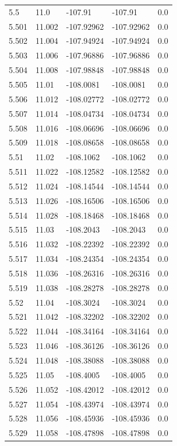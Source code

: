 \begin{tabular}{lllll}
5.5 & 11.0 & -107.91 & -107.91 & 0.0 \\
5.501 & 11.002 & -107.92962 & -107.92962 & 0.0 \\
5.502 & 11.004 & -107.94924 & -107.94924 & 0.0 \\
5.503 & 11.006 & -107.96886 & -107.96886 & 0.0 \\
5.504 & 11.008 & -107.98848 & -107.98848 & 0.0 \\
5.505 & 11.01 & -108.0081 & -108.0081 & 0.0 \\
5.506 & 11.012 & -108.02772 & -108.02772 & 0.0 \\
5.507 & 11.014 & -108.04734 & -108.04734 & 0.0 \\
5.508 & 11.016 & -108.06696 & -108.06696 & 0.0 \\
5.509 & 11.018 & -108.08658 & -108.08658 & 0.0 \\
5.51 & 11.02 & -108.1062 & -108.1062 & 0.0 \\
5.511 & 11.022 & -108.12582 & -108.12582 & 0.0 \\
5.512 & 11.024 & -108.14544 & -108.14544 & 0.0 \\
5.513 & 11.026 & -108.16506 & -108.16506 & 0.0 \\
5.514 & 11.028 & -108.18468 & -108.18468 & 0.0 \\
5.515 & 11.03 & -108.2043 & -108.2043 & 0.0 \\
5.516 & 11.032 & -108.22392 & -108.22392 & 0.0 \\
5.517 & 11.034 & -108.24354 & -108.24354 & 0.0 \\
5.518 & 11.036 & -108.26316 & -108.26316 & 0.0 \\
5.519 & 11.038 & -108.28278 & -108.28278 & 0.0 \\
5.52 & 11.04 & -108.3024 & -108.3024 & 0.0 \\
5.521 & 11.042 & -108.32202 & -108.32202 & 0.0 \\
5.522 & 11.044 & -108.34164 & -108.34164 & 0.0 \\
5.523 & 11.046 & -108.36126 & -108.36126 & 0.0 \\
5.524 & 11.048 & -108.38088 & -108.38088 & 0.0 \\
5.525 & 11.05 & -108.4005 & -108.4005 & 0.0 \\
5.526 & 11.052 & -108.42012 & -108.42012 & 0.0 \\
5.527 & 11.054 & -108.43974 & -108.43974 & 0.0 \\
5.528 & 11.056 & -108.45936 & -108.45936 & 0.0 \\
5.529 & 11.058 & -108.47898 & -108.47898 & 0.0 \\

\end{tabular}
